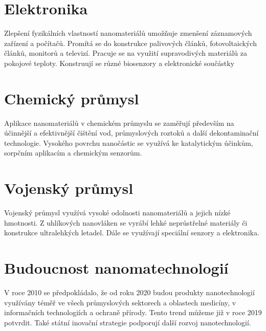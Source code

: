 \section{Elektronika}

    Zlepšení fyzikálních vlastností nanomateriálů umožňuje zmenšení záznamových zařízení a počítačů. Promítá se do konstrukce palivových článků, fotovoltaických článků, monitorů a televizí. Pracuje se na využití supravodivých materiálů za pokojové teploty. Konstruují se různé biosenzory a elektronické součástky \cite{filipova2012,nanoprotech2016} 

\section{Chemický průmysl}

    Aplikace nanomateriálů v chemickém průmyslu se zaměřují především na účinnější a efektivnější čištění vod, průmyslových roztoků a další dekontaminační technologie. Vysokého povrchu nanočástic se využívá ke katalytickým účinkům, sorpčním aplikacím a chemickým senzorům. \cite{nanoprotech2016,understanding_nano} 

\section{Vojenský průmysl}

    Vojenský průmysl využívá vysoké odolnosti nanomateriálů a jejich nízké hmotnosti. Z uhlíkových nanovláken se vyrábí lehké neprůstřelné materiály či konstrukce ultralehkých letadel. Dále se využívají speciální senzory a elektronika.  \cite{nanoprotech2016}
    
\section{Budoucnost nanomatechnologií}

   V roce 2010 se předpokládalo, že od roku 2020 budou produkty nanotechnologií využívány téměř ve všech průmyslových sektorech a oblastech medicíny, v informačních technologiích a ochraně přírody. \cite{filipova2012} Tento trend můžeme již v roce 2019 potvrdit. Také státní inovační strategie podporují další rozvoj nanotechnologií. 